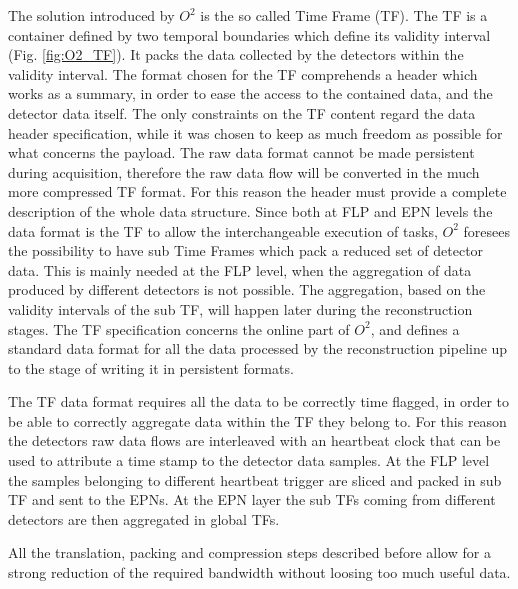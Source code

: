 The solution introduced by $O^2$ is the so called Time Frame (TF).
The TF is a container defined by two temporal boundaries which define its validity interval (Fig. \ref{fig:O2_TF}).
It packs the data collected by the detectors within the validity interval.
The format chosen for the TF comprehends a header which works as a summary, in order to ease the access to the contained data, and the detector data itself.
The only constraints on the TF content regard the data header specification, while it was chosen to keep as much freedom as possible for what concerns the payload.
The raw data format cannot be made persistent during acquisition, therefore the raw data flow will be converted in the much more compressed TF format.
For this reason the header must provide a complete description of the whole data structure.
Since both at FLP and EPN levels the data format is the TF to allow the interchangeable execution of tasks, $O^2$ foresees the possibility to have sub Time Frames which pack a reduced set of detector data.
This is mainly needed at the FLP level, when the aggregation of data produced by different detectors is not possible.
The aggregation, based on the validity intervals of the sub TF, will happen later during the reconstruction stages.
The TF specification concerns the online part of $O^2$, and defines a standard data format for all the data processed by the reconstruction pipeline up to the stage of writing it in persistent formats.

The TF data format requires all the data to be correctly time flagged, in order to be able to correctly aggregate data within the TF they belong to.
For this reason the detectors raw data flows are interleaved with an heartbeat clock that can be used to attribute a time stamp to the detector data samples.
At the FLP level the samples belonging to different heartbeat trigger are sliced and packed in sub TF and sent to the EPNs.
At the EPN layer the sub TFs coming from different detectors are then aggregated in global TFs.

All the translation, packing and compression steps described before allow for a strong reduction of the required bandwidth without loosing too much useful data.

